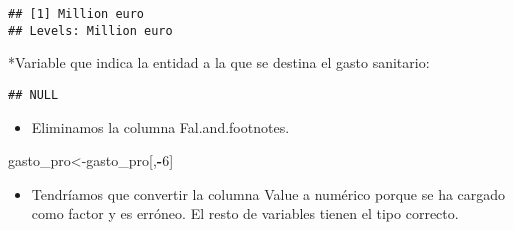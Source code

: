 \documentclass[]{article}
\newenvironment{Shaded}{\begin{snugshade}}{\end{snugshade}}
\newcommand{\DecValTok}[1]{\textcolor[rgb]{0.00,0.00,0.81}{#1}}
\newcommand{\KeywordTok}[1]{\textcolor[rgb]{0.13,0.29,0.53}{\textbf{#1}}}
\newcommand{\NormalTok}[1]{#1}
\newcommand{\OperatorTok}[1]{\textcolor[rgb]{0.81,0.36,0.00}{\textbf{#1}}}
\newcommand{\StringTok}[1]{\textcolor[rgb]{0.31,0.60,0.02}{#1}}
\providecommand{\tightlist}{%
  \setlength{\itemsep}{0pt}\setlength{\parskip}{0pt}}
\begin{document}
\begin{verbatim}
## [1] Million euro
## Levels: Million euro
\end{verbatim}

*Variable que indica la entidad a la que se destina el gasto sanitario:

\begin{Shaded}
\end{Shaded}

\begin{verbatim}
## NULL
\end{verbatim}

\begin{itemize}
\tightlist
\item
  Eliminamos la columna Fal.and.footnotes.
\end{itemize}

\begin{Shaded}
\begin{Highlighting}[]
\NormalTok{gasto_pro<-gasto_pro[,}\OperatorTok{-}\DecValTok{6}\NormalTok{]}
\end{Highlighting}
\end{Shaded}

\begin{itemize}
\tightlist
\item
  Tendríamos que convertir la columna Value a numérico porque se ha
  cargado como factor y es erróneo. El resto de variables tienen el tipo
  correcto.
\end{itemize}

\begin{Shaded}
\end{Shaded}
\end{document}
